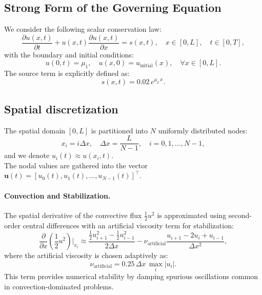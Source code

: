 \subsection{Strong Form of the Governing Equation}

We consider the following scalar conservation law:
\begin{equation}
\frac{\partial u(x,t)}{\partial t} + u(x,t)\frac{\partial u(x,t)}{\partial x} = s(x,t), \quad x \in [0, L],\quad t \in [0, T],
\label{eq:fd_strongform}
\end{equation}
with the boundary and initial conditions:
\begin{equation}
u(0,t)=\mu_1,\quad u(x,0)=u_{\text{initial}}(x), \quad \forall x \in [0,L].\end{equation}
The source term is explicitly defined as:
\begin{equation}
s(x,t) = 0.02\,e^{\mu_2\,x}.
\end{equation}

\subsection{Spatial discretization}

The spatial domain \([0,L]\) is partitioned into \(N\) uniformly distributed nodes:
\begin{equation}
x_i = i\Delta x, \quad \Delta x = \frac{L}{N-1}, \quad i = 0,1,\dots,N-1,
\end{equation}
and we denote \(u_i(t)\approx u(x_i,t)\). \\
The nodal values are gathered into the vector \(\mathbf{u}(t) = [u_0(t),u_1(t),\dots,u_{N-1}(t)]^\top\).

\paragraph{Convection and Stabilization.} The spatial derivative of the convective flux \(\frac{1}{2}u^2\) is approximated using second-order central differences with an artificial viscosity term for stabilization:
\begin{equation}
\frac{\partial}{\partial x}\left(\frac{1}{2}u^2\right)\bigg|_{x_i}\approx \frac{\frac{1}{2}u_{i+1}^2-\frac{1}{2}u_{i-1}^2}{2\Delta x} - \nu_{\text{artificial}}\frac{u_{i+1}-2u_i+u_{i-1}}{\Delta x^2},
\label{eq:fd_conv}
\end{equation}
where the artificial viscosity is chosen adaptively as:
\begin{equation}
\nu_{\text{artificial}} = 0.25\,\Delta x\,\max_{i}|u_i|.
\end{equation}
This term provides numerical stability by damping spurious oscillations common in convection-dominated problems.

